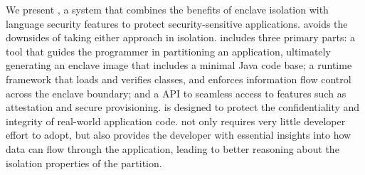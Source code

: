 We present \term{\sysname{}},
a system that combines the benefits of
 \sgx{} enclave isolation with \java{} language security features to protect security-sensitive applications.
\sysname{} avoids the downsides of taking either approach in isolation.
\sysname{} includes three primary parts:
a tool that guides the programmer in partitioning an application, ultimately generating an enclave image that includes
a minimal Java code base;
a runtime framework that loads and verifies classes, and enforces
information flow control across the enclave boundary;
and a \java{} API to seamless access to \sgx{} features such
as attestation and secure provisioning.
\sysname{} is designed to protect the confidentiality and integrity of 
real-world application code. 
\sysname{} not only requires very little developer effort to adopt, but also provides the developer
with essential insights into how data can flow through the application,
leading to better reasoning about the isolation properties of the partition.

